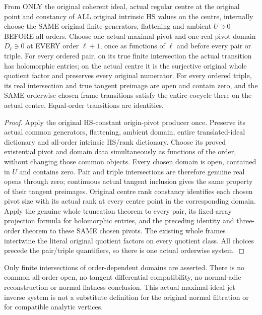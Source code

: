 \begin{theorem}
\label{hir:actual-hs-constant-centre-orderwise-jet-system}
From ONLY the original coherent ideal, actual regular centre at the
original point and constancy of ALL original intrinsic HS values on
the centre, internally choose the SAME original finite generators,
flattening and ambient $U\ni0$ BEFORE all orders. Choose one actual
maximal pivot and one real pivot domain $D_\ell\ni0$ at EVERY order
$\ell+1$, once as functions of $\ell$ and before every pair or triple.
For every ordered pair, on its true finite intersection the actual
transition has holomorphic entries; on the actual centre it is the
surjective original whole quotient factor and preserves every original
numerator. For every ordered triple, its real intersection and true
tangent preimage are open and contain zero, and the SAME orderwise
chosen frame transitions satisfy the entire cocycle there on the
actual centre. Equal-order transitions are identities.
\leanok
\end{theorem}
\begin{proof}
Apply the original HS-constant origin-pivot producer once. Preserve
its actual common generators, flattening, ambient domain, entire
translated-ideal dictionary and all-order intrinsic HS/rank dictionary.
Choose its proved existential pivot and domain data simultaneously as
functions of the order, without changing those common objects. Every
chosen domain is open, contained in $U$ and contains zero. Pair and
triple intersections are therefore genuine real opens through zero;
continuous actual tangent inclusion gives the same property of their
tangent preimages. Original centre rank constancy identifies each
chosen pivot size with its actual rank at every centre point in the
corresponding domain. Apply the genuine whole truncation theorem to
every pair, its fixed-array projection formula for holomorphic entries,
and the preceding identity and three-order theorem to these SAME
chosen pivots. The existing whole frames intertwine the literal
original quotient factors on every quotient class. All choices precede
the pair/triple quantifiers, so there is one actual orderwise system.
\end{proof}

Only finite intersections of order-dependent domains are asserted.
There is no common all-order open, no tangent differential compatibility,
no normal-adic reconstruction or normal-flatness conclusion. This
actual maximal-ideal jet inverse system is not a substitute definition
for the original normal filtration or for compatible analytic vertices.
